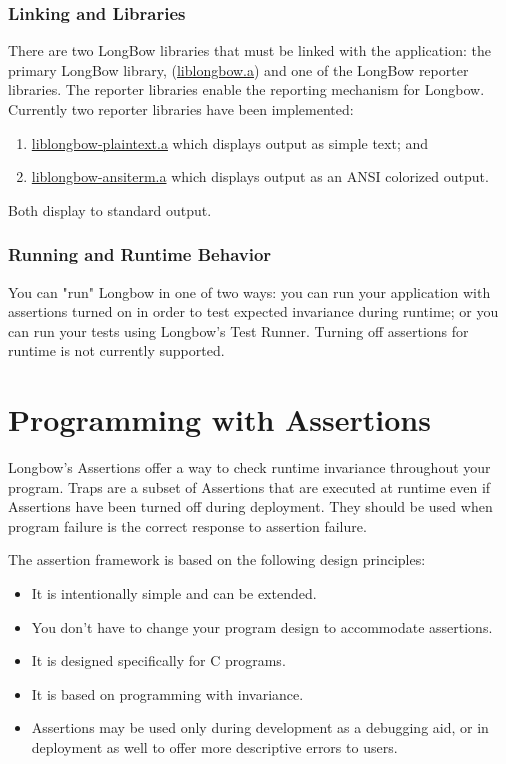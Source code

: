 \subsubsection{Linking and Libraries}
There are two LongBow libraries that must be linked with the application: the primary LongBow library, (\url{liblongbow.a}) and one of the LongBow reporter libraries.
The reporter libraries enable the reporting mechanism for Longbow.
Currently two reporter libraries have been implemented:
\begin{enumerate}
\item \url{liblongbow-plaintext.a} which displays output as simple text; and
\item \url{liblongbow-ansiterm.a} which displays output as an ANSI colorized output.
\end{enumerate}

Both display to standard output.

\subsubsection{Running and Runtime Behavior}
You can "run" Longbow in one of two ways: you can run your application with assertions turned on in order to test expected invariance during runtime; or you can run your tests using Longbow's Test Runner.
Turning off assertions for runtime is not currently supported.
 
\section{Programming with Assertions} 

Longbow's  Assertions offer a way to check runtime invariance throughout your program.
Traps are a subset of Assertions that are executed at runtime even if Assertions have been turned off during deployment. They should be used when program failure is the correct response to assertion failure.
 
The assertion framework is based on the following design principles:
\begin{itemize}
\item  It is intentionally simple and can be extended.
\item  You don't have to change your program design to accommodate assertions.
\item  It is designed specifically for C programs.
\item  It is based on programming with invariance.
\item  Assertions may be used only during development as a debugging aid, or in deployment as well to offer more descriptive errors to users.
\end{itemize}


